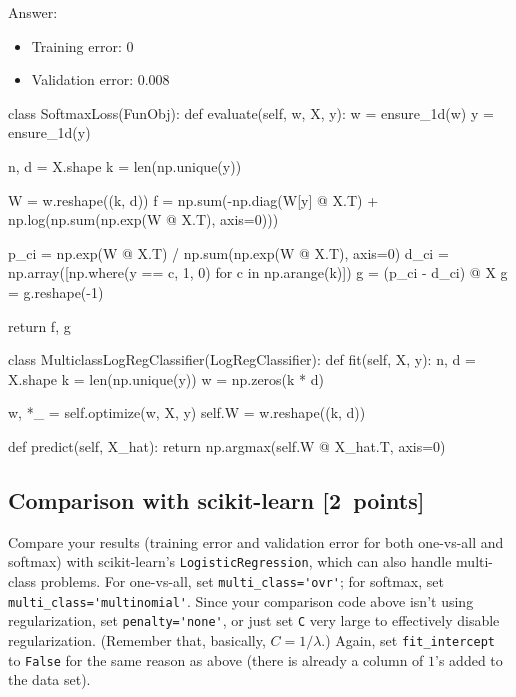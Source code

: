 \documentclass{article}
\newcommand{\blu}[1]{{\textcolor{blu}{#1}}}
\newenvironment{answer}{\par\begingroup\color{gre}Answer: }{\endgroup}
\let\ask\blu
\newcommand\pts[1]{\textcolor{pointscolour}{[#1~points]}}
\begin{document}
\begin{answer}
    \begin{itemize}
        \item Training error: 0
        \item Validation error: 0.008
    \end{itemize}
\end{answer}

\begin{python}
class SoftmaxLoss(FunObj):
    def evaluate(self, w, X, y):
        w = ensure_1d(w)
        y = ensure_1d(y)

        n, d = X.shape
        k = len(np.unique(y))

        W = w.reshape((k, d))
        f = np.sum(-np.diag(W[y] @ X.T) + np.log(np.sum(np.exp(W @ X.T), axis=0)))

        p_ci = np.exp(W @ X.T) / np.sum(np.exp(W @ X.T), axis=0)
        d_ci = np.array([np.where(y == c, 1, 0) for c in np.arange(k)])
        g = (p_ci - d_ci) @ X
        g = g.reshape(-1)

        return f, g
\end{python}

\begin{python}
class MulticlassLogRegClassifier(LogRegClassifier):
    def fit(self, X, y):
        n, d = X.shape
        k = len(np.unique(y))
        w = np.zeros(k * d)

        w, *_ = self.optimize(w, X, y)
        self.W = w.reshape((k, d))

    def predict(self, X_hat):
        return np.argmax(self.W @ X_hat.T, axis=0)
\end{python}


\subsection{Comparison with scikit-learn \pts{2}}
\ask{Compare your results (training error and validation error for both one-vs-all and softmax) with scikit-learn's \texttt{LogisticRegression}},
which can also handle multi-class problems.
For one-vs-all, set \verb|multi_class='ovr'|; for softmax, set \verb|multi_class='multinomial'|.
Since your comparison code above isn't using regularization, set \verb|penalty='none'|, or just set \verb|C| very large to effectively disable regularization.
(Remember that, basically, $C = 1 / \lambda$.)
Again, set \verb|fit_intercept| to \verb|False| for the same reason as above (there is already a column of $1$'s added to the data set).
\end{document}
